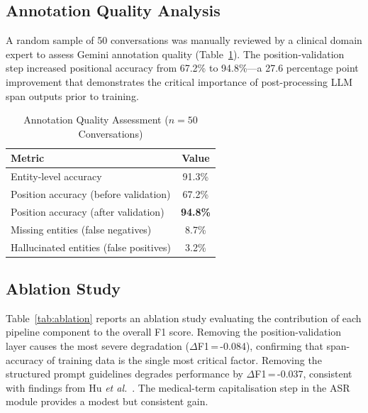 \documentclass[conference]{IEEEtran}
\newcommand{\etal}{\textit{et al.}}
\begin{document}
\subsection{Annotation Quality Analysis}

A random sample of 50 conversations was manually reviewed by a clinical domain
expert to assess Gemini annotation quality (Table~\ref{tab:annotation_quality}).
The position-validation step increased positional accuracy from 67.2\% to
94.8\%—a 27.6 percentage point improvement that demonstrates the critical
importance of post-processing LLM span outputs prior to training.

\begin{table}[t]
\centering
\caption{Annotation Quality Assessment ($n\!=\!50$ Conversations)}
\label{tab:annotation_quality}
\begin{tabular}{lc}
\toprule
\textbf{Metric} & \textbf{Value} \\
\midrule
Entity-level accuracy                  & 91.3\% \\
Position accuracy (before validation)  & 67.2\% \\
Position accuracy (after validation)   & \textbf{94.8\%} \\
Missing entities (false negatives)     &  8.7\% \\
Hallucinated entities (false positives)&  3.2\% \\
\bottomrule
\end{tabular}
\end{table}

\subsection{Ablation Study}

Table~\ref{tab:ablation} reports an ablation study evaluating the contribution
of each pipeline component to the overall F1 score. Removing the
position-validation layer causes the most severe degradation ($\Delta$F1\,=\,-0.084),
confirming that span-accuracy of training data is the single most critical factor.
Removing the structured prompt guidelines degrades performance by $\Delta$F1\,=\,-0.037,
consistent with findings from Hu \etal~\cite{hu2024improving}. The medical-term
capitalisation step in the ASR module provides a modest but consistent gain.
\end{document}
